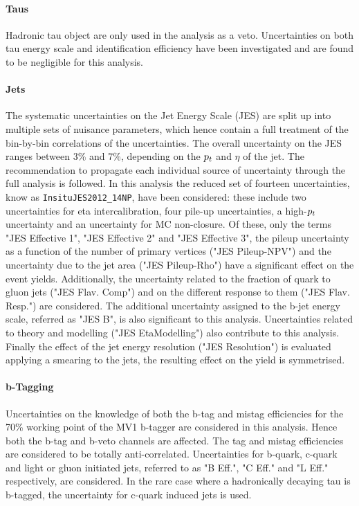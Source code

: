 \paragraph{Taus}
Hadronic tau object are only used in the analysis as a veto. Uncertainties on both tau energy scale 
and identification efficiency have been investigated and are found to be negligible for this analysis.

\paragraph{Jets}
The systematic uncertainties on the Jet Energy Scale (JES) are split up into multiple sets of nuisance parameters, which
 hence contain a full treatment of the bin-by-bin correlations of the uncertainties. The overall uncertainty on the JES ranges 
 between 3\% and 7\%, depending on the $p_{t}$ and $\eta$ of the jet. The recommendation \cite{TWIKI_JETMET} to propagate each individual 
 source of uncertainty through the full analysis is followed. In this analysis the reduced set of fourteen uncertainties, know as 
 \verb=InsituJES2012_14NP=, have been considered: these include two uncertainties for eta intercalibration, four pile-up 
 uncertainties, a high-$p_{t}$ uncertainty and an uncertainty for MC non-closure. Of these, only the terms "JES Effective 1", 
 "JES Effective 2" and "JES Effective 3", the pileup uncertainty as a function of the number of primary vertices ("JES Pileup-NPV") and the uncertainty due to the jet area ("JES Pileup-Rho") have a significant effect on the event yields. Additionally, 
 the uncertainty related to the fraction of quark to gluon jets ("JES Flav. Comp") and on the different response to them ("JES Flav. Resp.") are considered. The additional uncertainty assigned to the b-jet energy scale, referred as "JES B", is also 
 significant to this analysis. Uncertainties related to theory and modelling ("JES EtaModelling") also contribute to this 
 analysis. Finally the effect of the jet energy resolution ("JES Resolution") is evaluated applying a smearing to the jets, the 
 resulting effect on the yield is symmetrised.

\paragraph{b-Tagging}
Uncertainties on the knowledge of both the b-tag and mistag efficiencies for the 70\% working point of the MV1 b-tagger are
 considered in this analysis. Hence both the b-tag and b-veto channels are affected. The tag and mistag efficiencies are
  considered to be totally anti-correlated. Uncertainties for b-quark, c-quark and light or gluon initiated jets, referred to as 
  "B  Eff.", "C Eff." and "L Eff." respectively, are considered. In the rare case where a hadronically decaying 
  tau is b-tagged, the uncertainty for c-quark induced jets is used.


